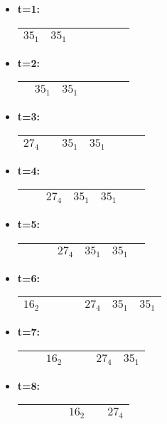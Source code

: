 \begin{itemize}
    \begin{itemize}
        \item \textbf{t=1:} \begin{tabular}{|p{1cm}|p{1cm}|p{1cm}|p{1cm}|p{1cm}|p{1cm}|p{1cm}|}
            \hline $35_1$&$35_1$& & & & &\\ \hline \end{tabular}
        \item \textbf{t=2:} \begin{tabular}{|p{1cm}|p{1cm}|p{1cm}|p{1cm}|p{1cm}|p{1cm}|p{1cm}|}
            \hline &$35_1$& $35_1$& & & &\\ \hline \end{tabular}
        \item \textbf{t=3:} \begin{tabular}{|p{1cm}|p{1cm}|p{1cm}|p{1cm}|p{1cm}|p{1cm}|p{1cm}|}
            \hline $27_4$& & $35_1$&$35_1$ & & &\\ \hline \end{tabular}
        \item \textbf{t=4:} \begin{tabular}{|p{1cm}|p{1cm}|p{1cm}|p{1cm}|p{1cm}|p{1cm}|p{1cm}|}
            \hline & & $27_4$& $35_1$& $35_1$& &\\ \hline \end{tabular}
        \item \textbf{t=5:} \begin{tabular}{|p{1cm}|p{1cm}|p{1cm}|p{1cm}|p{1cm}|p{1cm}|p{1cm}|}
            \hline & & & $27_4$& $35_1$& $35_1$&\\ \hline \end{tabular} 
        \item \textbf{t=6:} \begin{tabular}{|p{1cm}|p{1cm}|p{1cm}|p{1cm}|p{1cm}|p{1cm}|p{1cm}|}
            \hline $16_2$& & & & $27_4$& $35_1$& $35_1$ \\ \hline \end{tabular} 
        \item \textbf{t=7:} \begin{tabular}{|p{1cm}|p{1cm}|p{1cm}|p{1cm}|p{1cm}|p{1cm}|p{1cm}|}
            \hline & &$16_2$ & & & $27_4$& $35_1$ \\ \hline \end{tabular} 
        \item \textbf{t=8:} \begin{tabular}{|p{1cm}|p{1cm}|p{1cm}|p{1cm}|p{1cm}|p{1cm}|p{1cm}|}
            \hline & & & & $16_2$& & $27_4$ \\ \hline \end{tabular}

\end{itemize}
\end{itemize}
